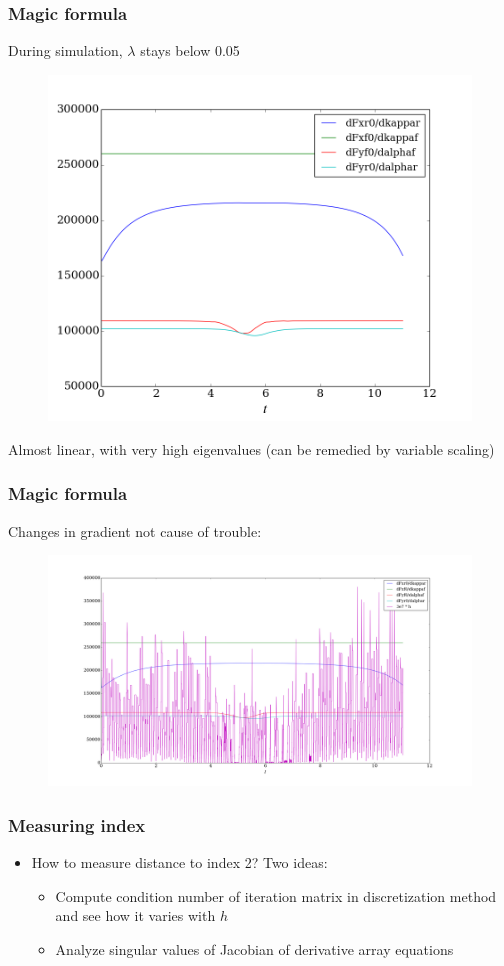 \documentclass[]{beamer}
\begin{document}
\begin{frame}
\frametitle{Magic formula}
During simulation, $\lambda$ stays below 0.05
\begin{figure}[H]
	\centering
	\includegraphics[width=0.67\linewidth]{force_grad.png}
\end{figure}
Almost linear, with very high eigenvalues (can be remedied by variable scaling)
\end{frame}

\begin{frame}
\frametitle{Magic formula}
Changes in gradient not cause of trouble:
\begin{figure}[H]
	\centering
	\includegraphics[width=\linewidth]{force_grad_steps.png}
\end{figure}
\end{frame}

\begin{frame}
\frametitle{Measuring index}
\begin{itemize}
\item
How to measure distance to index 2? Two ideas:
\begin{itemize}
\item
Compute condition number of iteration matrix in discretization method and see how it varies with $h$
\item
Analyze singular values of Jacobian of derivative array equations
\end{itemize}
\end{itemize}
\end{frame}
\end{document}
